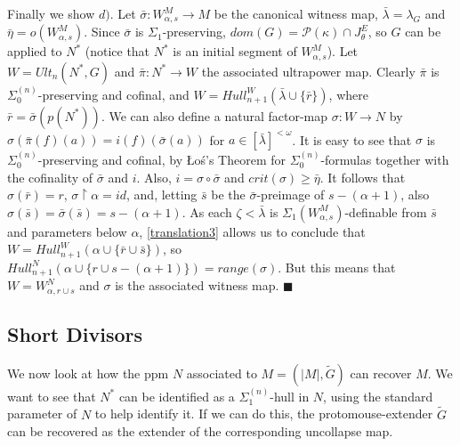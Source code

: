 \documentclass[12pt]{article}
\begin{document}
Finally we show $d)$.  Let $\bar{\sigma}: W_{\alpha , s}^M \longrightarrow M$ be the canonical witness map, $\bar{\lambda} = \lambda_G$ and $\bar{\eta} = o ( W_{\alpha , s}^M)$.  Since $\bar{\sigma}$ is $\Sigma_1$-preserving, $dom( G) = \mathcal{P} ( \kappa ) \cap J_{\theta}^E$, so $G$ can be applied to $N^*$ (notice that $N^*$ is an initial segment of $W_{\alpha , s}^M$).  Let $W = Ult_n (N^* , G )$ and $\bar{\pi} : N^* \longrightarrow W$ the associated ultrapower map.  Clearly $\bar{\pi}$ is $\Sigma_0^{(n)}$-preserving and cofinal, and $W = Hull_{n+1}^W ( \bar{\lambda} \cup \{ \bar{r} \} )$, where $\bar{r} = \bar{\sigma} ( p (N^*))$.  We can also define a natural factor-map $\sigma : W \longrightarrow N$ by $\sigma ( \bar{\pi} (f)(a)) = i (f) ( \bar{\sigma} (a))$ for $a \in [ \bar{\lambda} ]^{< \omega}$.  It is easy to see that $\sigma$ is $\Sigma_0^{(n)}$-preserving and cofinal, by {\L}o{\'s}'s Theorem for $\Sigma_0^{(n)}$-formulas together with the cofinality of $\bar{\sigma}$ and $i$.  Also, $i = \sigma \circ \bar{\sigma}$ and $crit (\sigma ) \geq \bar{\eta}$.  It follows that $\sigma ( \bar{r}) = r$, $\sigma \restriction \alpha = id$, and, letting $\bar{s}$ be the $\bar{\sigma}$-preimage of $s - ( \alpha + 1)$, also $\sigma ( \bar{s}) = \bar{\sigma} ( \bar{s}) = s - (\alpha + 1 )$.  As each $\zeta < \bar{\lambda}$ is $\Sigma_1 (W_{\alpha , s }^M )$-definable from $\bar{s}$ and parameters below $\alpha$, \ref{translation3} allows us to conclude that $W = Hull_{n+1}^W ( \alpha \cup \{ \bar{r} \cup \bar{s} \} )$, so $Hull_{n+1}^N ( \alpha \cup \{ r \cup s - ( \alpha + 1 ) \} ) = range( \sigma)$.  But this means that $W = W_{\alpha , r \cup s }^N$ and $\sigma$ is the associated witness map. $\blacksquare$\\ 







\subsection{Short Divisors}

We now look at how the ppm $N$ associated to $M = (|M| , \tilde{G})$ can recover $M$.  We want to see that $N^*$ can be identified as a $\Sigma_1^{(n)}$-hull in $N$, using the standard parameter of $N$ to help identify it.  If we can do this, the protomouse-extender $\tilde{G}$ can be recovered as the extender of the corresponding uncollapse map.\\
\end{document}

